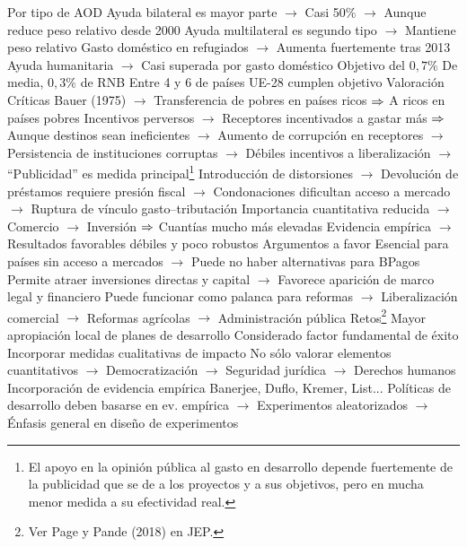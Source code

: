 \documentclass{nuevotema}
\begin{document}
\begin{esquemal}
				\4 Por tipo de AOD
				\4[] Ayuda bilateral es mayor parte
				\4[] $\to$ Casi 50\%
				\4[] $\to$ Aunque reduce peso relativo desde 2000
				\4[] Ayuda multilateral es segundo tipo
				\4[] $\to$ Mantiene peso relativo
				\4[] Gasto doméstico en refugiados
				\4[] $\to$ Aumenta fuertemente tras 2013
				\4[] Ayuda humanitaria
				\4[] $\to$ Casi superada por gasto doméstico
				\4 Objetivo del $0,7\%$
				\4[] De media, $0,3\%$ de RNB
				\4[] Entre 4 y 6 de países UE-28 cumplen objetivo
			\3 Valoración
				\4 Críticas
				\4[] Bauer (1975)
				\4[] $\to$ Transferencia de pobres en países ricos
				\4[] $\Rightarrow$ A ricos en países pobres
				\4[] Incentivos perversos
				\4[] $\to$ Receptores incentivados a gastar más
				\4[] $\Rightarrow$ Aunque destinos sean ineficientes
				\4[] $\to$ Aumento de corrupción en receptores
				\4[] $\to$ Persistencia de instituciones corruptas
				\4[] $\to$ Débiles incentivos a liberalización
				\4[] $\to$ ``Publicidad'' es medida principal\footnote{El apoyo en la opinión pública al gasto en desarrollo depende fuertemente de la publicidad que se de a los proyectos y a sus objetivos, pero en mucha menor medida a su efectividad real.}
				\4[] Introducción de distorsiones
				\4[] $\to$ Devolución de préstamos requiere presión fiscal
				\4[] $\to$ Condonaciones dificultan acceso a mercado
				\4[] $\to$ Ruptura de vínculo gasto--tributación
				\4[] Importancia cuantitativa reducida
				\4[] $\to$ Comercio
				\4[] $\to$ Inversión
				\4[] $\Rightarrow$ Cuantías mucho más elevadas
				\4[] Evidencia empírica
				\4[] $\to$ Resultados favorables débiles y poco robustos
				\4 Argumentos a favor
				\4[] Esencial para países sin acceso a mercados
				\4[] $\to$ Puede no haber alternativas para BPagos
				\4[] Permite atraer inversiones directas y capital
				\4[] $\to$ Favorece aparición de marco legal y financiero
				\4[] Puede funcionar como palanca para reformas
				\4[] $\to$ Liberalización comercial
				\4[] $\to$ Reformas agrícolas
				\4[] $\to$ Administración pública
			\3 Retos\footnote{Ver Page y Pande (2018) en JEP.}
				\4 Mayor apropiación local de planes de desarrollo
				\4[] Considerado factor fundamental de éxito
				\4 Incorporar medidas cualitativas de impacto
				\4[] No sólo valorar elementos cuantitativos
				\4[] $\to$ Democratización
				\4[] $\to$ Seguridad jurídica
				\4[] $\to$ Derechos humanos
				\4 Incorporación de evidencia empírica
				\4[] Banerjee, Duflo, Kremer, List...
				\4[] Políticas de desarrollo deben basarse en ev. empírica
				\4[] $\to$ Experimentos aleatorizados
				\4[] $\to$ Énfasis general en diseño de experimentos

\end{esquemal}
\end{document}

